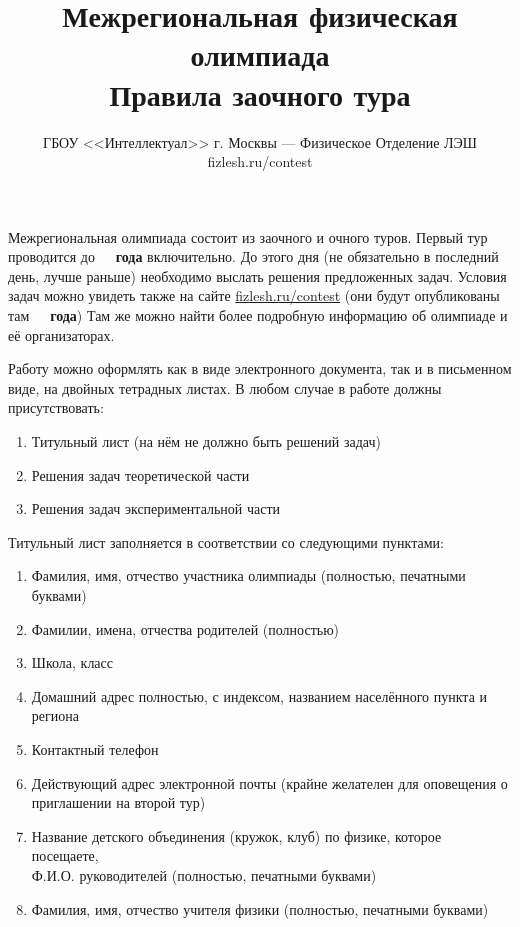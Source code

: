 \documentclass[a4paper,12pt]{article}
\title{\bf Межрегиональная физическая олимпиада\\Правила заочного тура}
\author{ГБОУ <<Интеллектуал>> г. Москвы --- Физическое Отделение ЛЭШ\\
fizlesh.ru/contest}
\begin{document}
\maketitle
\thispagestyle{empty}

Межрегиональная олимпиада состоит из заочного и очного туров. Первый тур проводится
до \textbf{\olympdateend~\olympyearend~года} включительно.
До этого дня (не обязательно в последний день, лучше раньше) необходимо выслать решения предложенных задач.
Условия задач можно увидеть также на сайте \href{http://fizlesh.ru/contest}{fizlesh.ru/contest}
(они будут опубликованы там \textbf{\olympdatestart~\olympyearstart~года})
Там же можно найти более подробную информацию об олимпиаде и её организаторах.

\bigskip

Работу можно оформлять как в виде электронного документа, так и в письменном виде, на двойных тетрадных листах.
В любом случае в работе должны присутствовать:
\begin{enumerate}
\setlength{\itemsep}{-3pt}
\item Титульный лист (на нём не должно быть решений задач)
\item Решения задач теоретической части
\item Решения задач экспериментальной части
\end{enumerate}

Титульный лист заполняется в соответствии со следующими пунктами:
\begin{enumerate}
\setlength{\itemsep}{-3pt}
\item Фамилия, имя, отчество участника олимпиады (полностью, печатными буквами)
\item Фамилии, имена, отчества родителей (полностью)
\item Школа, класс
\item Домашний адрес полностью, с индексом, названием населённого пункта и региона
\item Контактный телефон
\item Действующий адрес электронной почты (крайне желателен для оповещения о приглашении на второй тур)
\item Название детского объединения (кружок, клуб) по физике, которое посещаете,\\
Ф.И.О. руководителей (полностью, печатными буквами)
\item Фамилия, имя, отчество учителя физики (полностью, печатными буквами)
\end{enumerate}
\end{document}
